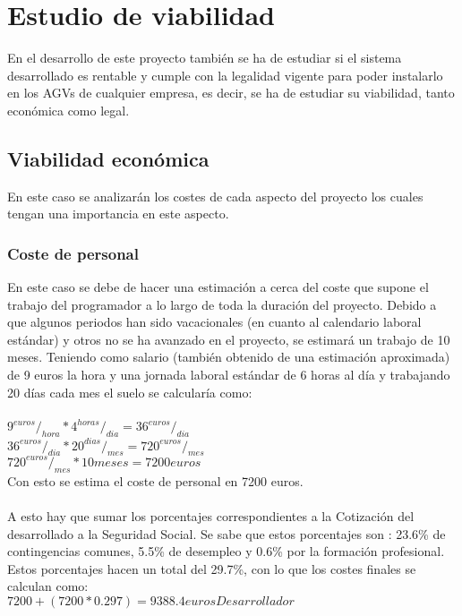 \section{Estudio de viabilidad}
En el desarrollo de este proyecto también se ha de estudiar si el sistema desarrollado es rentable y cumple con la legalidad vigente para poder instalarlo en los AGVs de cualquier empresa, es decir, se ha de estudiar su viabilidad, tanto económica como legal.\\

\subsection{Viabilidad económica}
En este caso se analizarán los costes de cada aspecto del proyecto los cuales tengan una importancia en este aspecto.

\subsubsection{Coste de personal}
En este caso se debe de hacer una estimación a cerca del coste que supone el trabajo del programador a lo largo de toda la duración del proyecto. Debido a que algunos periodos han sido vacacionales (en cuanto al calendario laboral estándar) y otros no se ha avanzado en el proyecto, se estimará un trabajo de 10 meses. Teniendo como salario (también obtenido de una estimación aproximada) de 9 euros la hora y una jornada laboral estándar de 6 horas al día y trabajando 20 días cada mes el suelo se calcularía como: \\
\\
$9 ^{euros}/_{hora} * 4 ^{horas}/_{dia} = 36 ^{euros}/_{dia}$ \\
$36 ^{euros}/_{dia} * 20 ^{dias}/_{mes} = 720 ^{euros}/_{mes}$ \\
$720 ^{euros}/_{mes} * 10 meses = 7200 euros$ \\
Con esto se estima el coste de personal en 7200 euros.\\
\\
A esto hay que sumar los porcentajes correspondientes a la Cotización del desarrollado a la Seguridad Social. Se sabe que estos porcentajes son : 23.6\% de contingencias comunes, 5.5\% de desempleo y 0.6\% por la formación profesional. Estos porcentajes hacen un total del 29.7\%, con lo que los costes finales se calculan como:\\
$7200 + (7200 * 0.297) = 9388.4 eurosDesarrollador$\\

